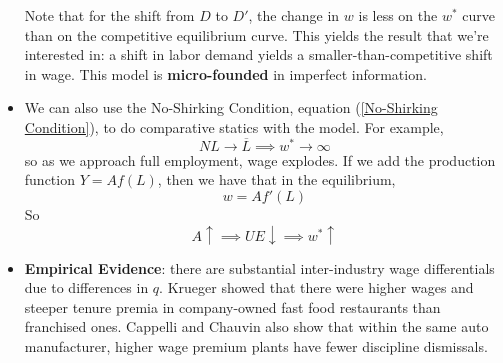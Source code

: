 \documentclass[12pt]{article}
\begin{document}
\begin{itemize}
\begin{center}
    \end{center}
    Note that for the shift from $D$ to $D'$, the change in $w$ is less on the $w^*$ curve than on the competitive equilibrium curve. This yields the result that we're interested in: a shift in labor demand yields a smaller-than-competitive shift in wage. This model is \textbf{micro-founded} in imperfect information.
    \item We can also use the No-Shirking Condition, equation (\ref{No-Shirking Condition}), to do comparative statics with the model. For example, 
    \[NL \to \overline{L} \implies w^* \to \infty\]
    so as we approach full employment, wage explodes. If we add the production function $Y = Af(L)$, then we have that in the equilibrium,
    \[w = Af'(L)\]
    So 
    \[A \uparrow \implies UE \downarrow \implies w^* \uparrow\]
    \item \textbf{Empirical Evidence}: there are substantial inter-industry wage differentials due to differences in $q$. Krueger showed that there were higher wages and steeper tenure premia in company-owned fast food restaurants than franchised ones. Cappelli and Chauvin also show that within the same auto manufacturer, higher wage premium plants have fewer discipline dismissals. 
\end{itemize}
\end{document}
